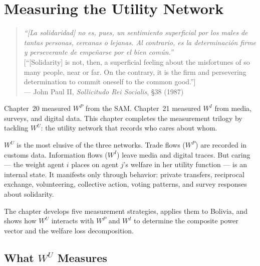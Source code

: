 \documentclass[../structural_economics_book.tex]{subfiles}
\begin{document}
\ifSubfilesClassLoaded{\setcounter{chapter}{21}}{}
\chapter{Measuring the Utility Network}\label{ch:22}
\begin{quote}
\textit{``[La solidaridad] no es, pues, un sentimiento superficial por los males de tantas personas, cercanas o lejanas. Al contrario, es la determinaci\'{o}n firme y perseverante de empe\~{n}arse por el bien com\'{u}n.''}\\[0.3em]
\textnormal{[``[Solidarity] is not, then, a superficial feeling about the misfortunes of so many people, near or far. On the contrary, it is the firm and persevering determination to commit oneself to the common good.'']}\\
\hfill --- John Paul II, \textit{Sollicitudo Rei Socialis}, \S 38 (1987)
\end{quote}
\nocite{johnpaulii1987sollicitudo}

\vspace{1em}

Chapter~20 measured $W^P$ from the SAM. Chapter~21 measured $W^I$ from media, surveys, and digital data. This chapter completes the measurement trilogy by tackling $W^U$: the utility network that records who cares about whom.

$W^U$ is the most elusive of the three networks. Trade flows ($W^P$) are recorded in customs data. Information flows ($W^I$) leave media and digital traces. But caring --- the weight agent $i$ places on agent $j$'s welfare in her utility function --- is an internal state. It manifests only through behavior: private transfers, reciprocal exchange, volunteering, collective action, voting patterns, and survey responses about solidarity.

The chapter develops five measurement strategies, applies them to Bolivia, and shows how $W^U$ interacts with $W^P$ and $W^I$ to determine the composite power vector and the welfare loss decomposition.


\section{What $W^U$ Measures}
\label{ch22:sec:what}
\end{document}
